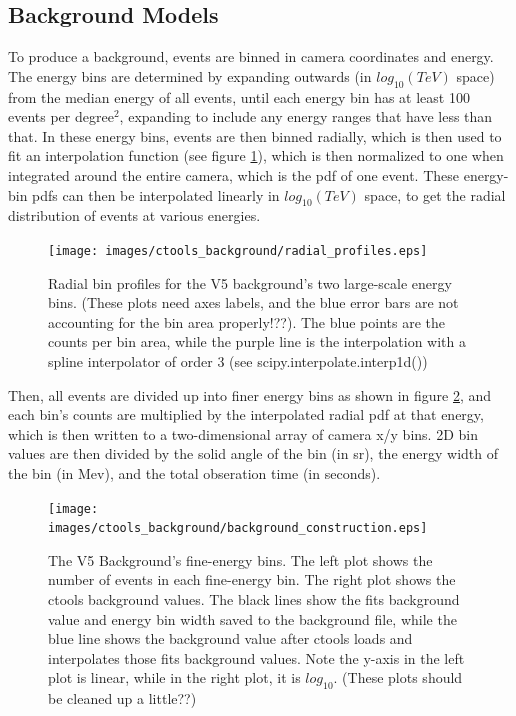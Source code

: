 \subsection{Background Models}\label{background_production}

To produce a background, events are binned in camera coordinates and energy.
The energy bins are determined by expanding outwards (in $log_{10}(TeV)$ space) from the median energy of all events, until each energy bin has at least 100 events per degree$^2$, expanding to include any energy ranges that have less than that.
In these energy bins, events are then binned radially, which is then used to fit an interpolation function (see figure \ref{fig:background_radial}), which is then normalized to one when integrated around the entire camera, which is the pdf of one event.
These energy-bin pdfs can then be interpolated linearly in $log_{10}(TeV)$ space, to get the radial distribution of events at various energies.

\begin{figure}[ht]
  \begin{center}
    \texttt{[image: images/ctools\_background/radial\_profiles.eps]}
    \caption[CTOOLS Radial Background Profiles]{Radial bin profiles for the V5 background's two large-scale energy bins.  (These plots need axes labels, and the blue error bars are not accounting for the bin area properly!??).  The blue points are the counts per bin area, while the purple line is the interpolation with a spline interpolator of order 3 (see scipy.interpolate.interp1d())}\label{fig:background_radial}
  \end{center}
\end{figure}


Then, all events are divided up into  finer energy bins as shown in figure \ref{fig:background_profile}, and each bin's counts are multiplied by the interpolated radial pdf at that energy, which is then written to a two-dimensional array of camera x/y bins.
2D bin values are then divided by the solid angle of the bin (in sr), the energy width of the bin (in Mev), and the total obseration time (in seconds).

\begin{figure}[ht]
  \begin{center}
    \texttt{[image: images/ctools\_background/background\_construction.eps]}
    \caption[CTOOLS Background Fine Energy Bins]{The V5 Background's fine-energy bins.  The left plot shows the number of events in each fine-energy bin.  The right plot shows the ctools background values.  The black lines show the fits background value and energy bin width saved to the background file, while the blue line shows the background value after ctools loads and interpolates those fits background values.  Note the y-axis in the left plot is linear, while in the right plot, it is $log_{10}$. (These plots should be cleaned up a little??)}\label{fig:background_profile}
  \end{center}
\end{figure}

